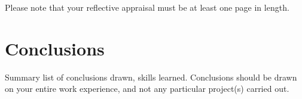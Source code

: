 \documentclass[pdftex, 12pt, a4paper, twoside]{article} %
\renewcommand*\thesubsection{\arabic{section}.\arabic{subsection}}
\let\oldsection\section
\def\section{\clearpage\oldsection}
\begin{document}
Please note that your reflective appraisal must be at least one page in length. 

\lipsum[1-2]

\section{Conclusions}
\label{sec:conclusions}

Summary list of conclusions drawn, skills learned. Conclusions should be drawn on your entire work experience, and not any particular project(s) carried out.

\lipsum[1-2]




\appendix

\renewcommand*\thesubsection{\Alph{section}.\arabic{subsection}}
\setcounter{figure}{0} \renewcommand{\thefigure}{A.\arabic{figure}}
\setcounter{table}{0} \renewcommand{\thetable}{A.\arabic{table}}




\end{document}
